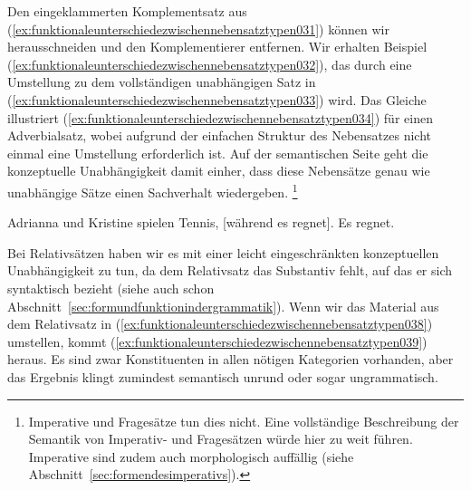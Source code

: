 Den eingeklammerten Komplementsatz aus (\ref{ex:funktionaleunterschiedezwischennebensatztypen031}) können wir herausschneiden und den Komplementierer entfernen.
Wir erhalten Beispiel (\ref{ex:funktionaleunterschiedezwischennebensatztypen032}), das durch eine Umstellung zu dem vollständigen unabhängigen Satz in (\ref{ex:funktionaleunterschiedezwischennebensatztypen033}) wird.
Das Gleiche illustriert (\ref{ex:funktionaleunterschiedezwischennebensatztypen034}) für einen Adverbialsatz, wobei aufgrund der einfachen Struktur des Nebensatzes nicht einmal eine Umstellung erforderlich ist.
Auf der semantischen Seite geht die konzeptuelle Unabhängigkeit damit einher, dass diese Nebensätze genau wie unabhängige Sätze einen Sachverhalt wiedergeben.%
\footnote{Imperative und Fragesätze tun dies nicht.
Eine vollständige Beschreibung der Semantik von Imperativ- und Fragesätzen würde hier zu weit führen.
Imperative sind zudem auch morphologisch auffällig (siehe Abschnitt~\ref{sec:formendesimperativs}).}

\begin{exe}
  \ex\label{ex:funktionaleunterschiedezwischennebensatztypen034}
  \begin{xlist}
    \ex\label{ex:funktionaleunterschiedezwischennebensatztypen035} Adrianna und Kristine spielen Tennis, [während es regnet].
    \ex\label{ex:funktionaleunterschiedezwischennebensatztypen036} Es regnet.
  \end{xlist}
\end{exe}

Bei Relativsätzen haben wir es mit einer leicht eingeschränkten konzeptuellen Unabhängigkeit zu tun, da dem Relativsatz das Substantiv fehlt, auf das er sich syntaktisch bezieht (siehe auch schon Abschnitt~\ref{sec:formundfunktionindergrammatik}).
Wenn wir das Material aus dem Relativsatz in (\ref{ex:funktionaleunterschiedezwischennebensatztypen038}) umstellen, kommt (\ref{ex:funktionaleunterschiedezwischennebensatztypen039}) heraus.
Es sind zwar Konstituenten in allen nötigen Kategorien vorhanden, aber das Ergebnis klingt zumindest semantisch unrund oder sogar ungrammatisch.

\begin{exe}
  \ex\label{ex:funktionaleunterschiedezwischennebensatztypen037}
  \begin{xlist}
  \end{xlist}
\end{exe}

